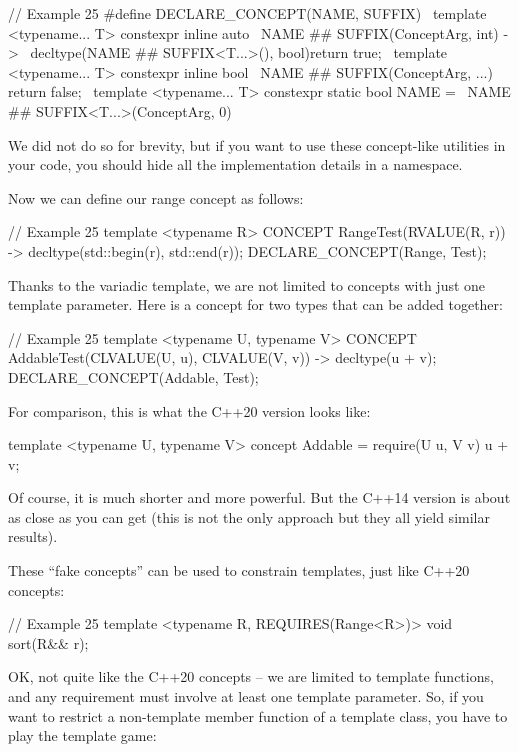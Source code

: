 \begin{code}
// Example 25
#define DECLARE_CONCEPT(NAME, SUFFIX) \
template <typename... T> constexpr inline auto     \
  NAME ## SUFFIX(ConceptArg, int) -> \
  decltype(NAME ## SUFFIX<T...>(), bool{}){return true;} \
template <typename... T> constexpr inline bool \
  NAME ## SUFFIX(ConceptArg, ...) { return false; } \
template <typename... T> constexpr static bool NAME = \
  NAME ## SUFFIX<T...>(ConceptArg{}, 0)
\end{code}

We did not do so for brevity, but if you want to use these concept-like utilities in your code, you should hide all the implementation details in a namespace.

Now we can define our range concept as follows:

\begin{code}
// Example 25
template <typename R> CONCEPT RangeTest(RVALUE(R, r)) ->
  decltype(std::begin(r), std::end(r));
DECLARE_CONCEPT(Range, Test);
\end{code}

Thanks to the variadic template, we are not limited to concepts with just one template parameter. Here is a concept for two types that can be added together:

\begin{code}
// Example 25
template <typename U, typename V> CONCEPT
  AddableTest(CLVALUE(U, u), CLVALUE(V, v)) ->
  decltype(u + v);
DECLARE_CONCEPT(Addable, Test);
\end{code}

For comparison, this is what the C++20 version looks like:

\begin{code}
template <typename U, typename V> concept Addable =
  require(U u, V v) { u + v; }
\end{code}

Of course, it is much shorter and more powerful. But the C++14 version is about as close as you can get (this is not the only approach but they all yield similar results).

These ``fake concepts'' can be used to constrain templates, just like C++20 concepts:

\begin{code}
 // Example 25
template <typename R, REQUIRES(Range<R>)> void sort(R&& r);
\end{code}

OK, not quite like the C++20 concepts -- we are limited to template functions, and any requirement must involve at least one template parameter. So, if you want to restrict a non-template member function of a template class, you have to play the template game:

